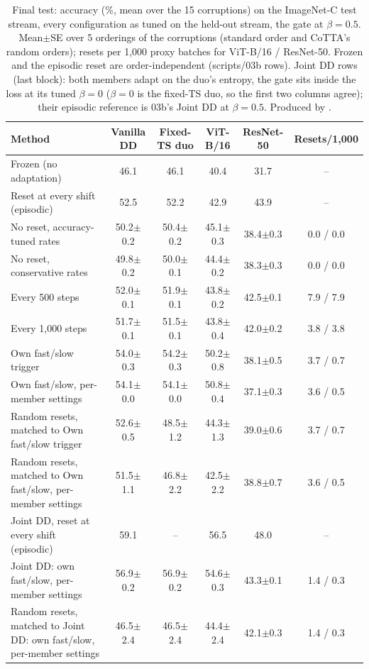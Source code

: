 \begin{table}[t]
  \centering\small
  \begin{tabular}{@{}lccccc@{}}
    \toprule
    Method & Vanilla DD & Fixed-TS duo & ViT-B/16 & ResNet-50 & Resets/1,000 \\
    \midrule
    Frozen (no adaptation) & 46.1 & 46.1 & 40.4 & 31.7 & -- \\
    Reset at every shift (episodic) & 52.5 & 52.2 & 42.9 & 43.9 & -- \\
    \midrule
    No reset, accuracy-tuned rates & 50.2$\pm$0.2 & 50.4$\pm$0.2 & 45.1$\pm$0.3 & 38.4$\pm$0.3 & 0.0 / 0.0 \\
    No reset, conservative rates & 49.8$\pm$0.2 & 50.0$\pm$0.1 & 44.4$\pm$0.2 & 38.3$\pm$0.3 & 0.0 / 0.0 \\
    \midrule
    Every 500 steps & 52.0$\pm$0.1 & 51.9$\pm$0.1 & 43.8$\pm$0.2 & 42.5$\pm$0.1 & 7.9 / 7.9 \\
    Every 1,000 steps & 51.7$\pm$0.1 & 51.5$\pm$0.1 & 43.8$\pm$0.4 & 42.0$\pm$0.2 & 3.8 / 3.8 \\
    \midrule
    Own fast/slow trigger & 54.0$\pm$0.3 & 54.2$\pm$0.3 & 50.2$\pm$0.8 & 38.1$\pm$0.5 & 3.7 / 0.7 \\
    Own fast/slow, per-member settings & 54.1$\pm$0.0 & 54.1$\pm$0.0 & 50.8$\pm$0.4 & 37.1$\pm$0.3 & 3.6 / 0.5 \\
    \midrule
    Random resets, matched to Own fast/slow trigger & 52.6$\pm$0.5 & 48.5$\pm$1.2 & 44.3$\pm$1.3 & 39.0$\pm$0.6 & 3.7 / 0.7 \\
    Random resets, matched to Own fast/slow, per-member settings & 51.5$\pm$1.1 & 46.8$\pm$2.2 & 42.5$\pm$2.2 & 38.8$\pm$0.7 & 3.6 / 0.5 \\
    \midrule
    Joint DD, reset at every shift (episodic) & 59.1 & -- & 56.5 & 48.0 & -- \\
    \midrule
    Joint DD: own fast/slow, per-member settings & 56.9$\pm$0.2 & 56.9$\pm$0.2 & 54.6$\pm$0.3 & 43.3$\pm$0.1 & 1.4 / 0.3 \\
    \midrule
    Random resets, matched to Joint DD: own fast/slow, per-member settings & 46.5$\pm$2.4 & 46.5$\pm$2.4 & 44.4$\pm$2.4 & 42.1$\pm$0.3 & 1.4 / 0.3 \\
    \bottomrule
  \end{tabular}
  \caption{Final test: accuracy (\%, mean over the 15 corruptions) on the ImageNet-C test stream, every configuration as tuned on the held-out stream, the gate at $\beta=0.5$. Mean$\pm$SE over 5 orderings of the corruptions (standard order and CoTTA's random orders); resets per 1,000 proxy batches for ViT-B/16 / ResNet-50. Frozen and the episodic reset are order-independent (scripts/03b rows). Joint DD rows (last block): both members adapt on the duo's entropy, the gate sits inside the loss at its tuned $\beta=0$ ($\beta=0$ is the fixed-TS duo, so the first two columns agree); their episodic reference is 03b's Joint DD at $\beta=0.5$. Produced by .}
  \label{tab:final_test}
\end{table}
